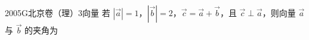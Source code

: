 
\begin{problem}{2005}{G}{北京卷（理）}{3}{向量}
若 $ |\vec{a}|=1 $，$ |\vec{b}|=2 $，$ \vec{c}=\vec{a}+\vec{b} $，且 $ \vec{c}\perp\vec{a} $，则向量 $ \vec{a} $ 与 $ \vec{b} $ 的夹角为
\begin{choices}
\end{choices}
\end{problem}

\begin{answer}

\end{answer}

\begin{solutions}

\end{solutions}